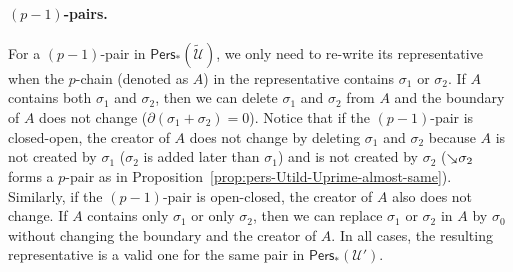 \documentclass[letterpaper,11pt]{article}
\theoremstyle{mythmstyle}
\theoremstyle{mydefstyle}
\theoremstyle{plain}
\theoremstyle{definition}
\newcommand{\Pers}{\mathsf{Pers}}
\newcommand{\<}[1]{\langle #1\rangle}
\newcommand{\add}[1]{\mskip-2.5mu\rotatebox[origin=c]{-45}{${\rightarrow}$}{#1}}
\newcommand{\Ucal}{\mathcal{U}}
\newcommand{\sG}{\sigma}
\newcommand{\Dim}{p}
\begin{document}
\paragraph{$(\Dim-1)$-pairs.}
For a $(\Dim-1)$-pair  in $\Pers_*(\tilde{\Ucal})$,
we only need to re-write its representative 
when the $\Dim$-chain (denoted as $A$) in the representative
contains $\sG_1$ or $\sG_2$.
If $A$ contains both $\sG_1$ and $\sG_2$,
then we can delete $\sG_1$ and $\sG_2$ from $A$
and the boundary of $A$ does not change ($\partial(\sG_1+\sG_2)=0$).
Notice that 
if the $(\Dim-1)$-pair is closed-open,
the creator of $A$ does not change 
by deleting $\sG_1$ and $\sG_2$ 
because $A$ is not created by $\sG_1$ ($\sG_2$ is added later than $\sG_1$)
and is not created by $\sG_2$ ($\add{\sG_2}$ forms a $\Dim$-pair 
as in Proposition~\ref{prop:pers-Utild-Uprime-almost-same}).
Similarly,
if the $(\Dim-1)$-pair is open-closed,
the creator of $A$ also does not change.
If $A$ contains only $\sG_1$ or only $\sG_2$,
then we can replace  $\sG_1$ or $\sG_2$ in $A$ by $\sG_0$
without changing the boundary and the  creator of $A$.
In all cases,
the resulting representative is a valid one for the same pair in $\Pers_*(\Ucal')$.
\end{document}
